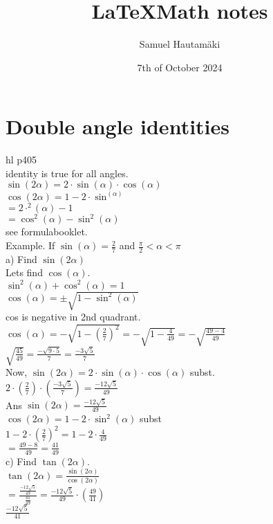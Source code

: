 \documentclass{article}
\title{\LaTeX Math notes}
\author{Samuel Hautamäki}
\date{7th of October 2024}
\begin{document}
  \maketitle
   
  \section{Double angle identities}
  hl p405\\
  identity is true for all angles.\\
  $\sin(2\alpha)=2\cdot\sin(\alpha)\cdot\cos(\alpha)$\\
  $\cos(2\alpha)=1-2\cdot\sin^(\alpha)$\\
  $=2\cdot^2(\alpha)-1$\\
  $=\cos^2(\alpha)-\sin^2(\alpha)$\\
  see formulabooklet.\\
  Example. If $\sin(\alpha)=\frac{2}{7}$ and $\frac{\pi}{2}<\alpha<\pi$\\
  a) Find $\sin(2\alpha)$\\
  Lets find $\cos(\alpha)$.\\
  $\sin^2(\alpha)+\cos^2(\alpha)=1$\\
  $\cos(\alpha)=\pm\sqrt{1-\sin^2(\alpha)}$\\
  cos is negative in 2nd quadrant.\\
  $\cos(\alpha)=-\sqrt{1-(\frac{2}{7})^2}=-\sqrt{1-\frac{4}{49}}=-\sqrt{\frac{49-4}{49}}$\\
  $\sqrt{\frac{45}{49}}=\frac{-\sqrt{9\cdot5}}{7}=\frac{-3\sqrt{5}}{7}$\\
  Now, $\sin(2\alpha)=2\cdot\sin(\alpha)\cdot\cos(\alpha)$ subst.\\
  $2\cdot(\frac{2}{7})\cdot(\frac{-3\sqrt{5}}{7})=\frac{-12\sqrt{5}}{49}$\\
  Ans $\sin(2\alpha)=\frac{-12\sqrt{5}}{49}$\\
  $\cos(2\alpha)=1-2\cdot\sin^2(\alpha)$ subst\\
  $1-2\cdot(\frac{2}{7})^2=1-2\cdot\frac{4}{49}$\\
  $=\frac{49-8}{49}=\frac{41}{49}$\\
  c) Find $\tan(2\alpha).$\\
  $\tan(2\alpha)=\frac{\sin(2\alpha)}{\cos(2\alpha)}$\\
  $=\frac{\frac{-12\sqrt{5}}{49}}{\frac{41}{49}}=\frac{-12\sqrt{5}}{49}\cdot(\frac{49}{41})$\\
  $\frac{-12\sqrt{5}}{41}$
\end{document}
